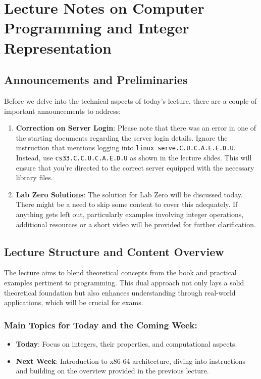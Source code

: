 \documentclass{article}
\begin{document}
\tableofcontents
\newpage

\section{Lecture Notes on Computer Programming and Integer Representation}

\subsection{Announcements and Preliminaries}

Before we delve into the technical aspects of today's lecture, there are a couple of important announcements to address:

\begin{enumerate}
    \item \textbf{Correction on Server Login}: Please note that there was an error in one of the starting documents regarding the server login details. Ignore the instruction that mentions logging into \texttt{linux serve.C.U.C.A.E.E.D.U}. Instead, use \texttt{cs33.C.C.U.C.A.E.D.U} as shown in the lecture slides. This will ensure that you're directed to the correct server equipped with the necessary library files.
    
    \item \textbf{Lab Zero Solutions}: The solution for Lab Zero will be discussed today. There might be a need to skip some content to cover this adequately. If anything gets left out, particularly examples involving integer operations, additional resources or a short video will be provided for further clarification.
\end{enumerate}

\subsection{Lecture Structure and Content Overview}

The lecture aims to blend theoretical concepts from the book and practical examples pertinent to programming. This dual approach not only lays a solid theoretical foundation but also enhances understanding through real-world applications, which will be crucial for exams.

\subsubsection{Main Topics for Today and the Coming Week:}

\begin{itemize}
    \item \textbf{Today}: Focus on integers, their properties, and computational aspects.
    \item \textbf{Next Week}: Introduction to x86-64 architecture, diving into instructions and building on the overview provided in the previous lecture.
\end{itemize}
\end{document}
